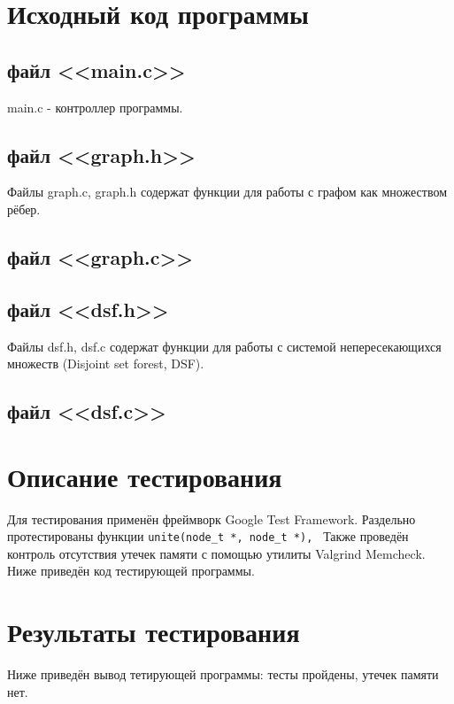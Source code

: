 \documentclass[a4paper,12pt]{article} %
\begin{document}

\setcounter{page}{2}
\tableofcontents
\newpage

\newpage
\section{Исходный код программы}
\subsection{файл <<main.c>>}
main.c - контроллер программы.

\subsection{файл <<graph.h>>}
Файлы graph.c, graph.h содержат функции для работы с графом как множеством рёбер.

\subsection{файл <<graph.c>>}

\subsection{файл <<dsf.h>>}
Файлы dsf.h, dsf.c содержат функции для работы с системой непересекающихся множеств (Disjoint set forest, DSF).

\newpage
\subsection{файл <<dsf.c>>}

\section{Описание тестирования}
Для тестирования применён фреймворк Google Test Framework. Раздельно протестированы функции \lstinline|unite(node_t *, node_t *), | Также проведён контроль отсутствия утечек памяти с помощью утилиты Valgrind Memcheck. Ниже приведён код тестирующей программы.\\

\newpage
\section{Результаты тестирования}
Ниже приведён вывод тетирующей программы: тесты пройдены, утечек памяти нет.\\
\newpage
\end{document}
